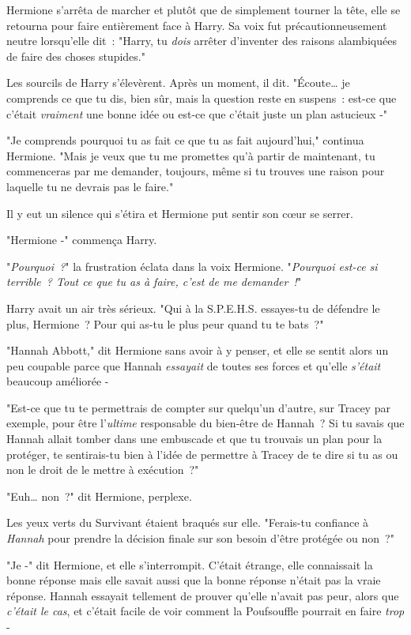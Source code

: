 Hermione s'arrêta de marcher et plutôt que de simplement tourner la tête, elle se retourna pour faire entièrement face à Harry. Sa voix fut précautionneusement neutre lorsqu'elle dit~: "Harry, tu \emph{dois} arrêter d'inventer des raisons alambiquées de faire des choses stupides."

Les sourcils de Harry s'élevèrent. Après un moment, il dit. "Écoute… je comprends ce que tu dis, bien sûr, mais la question reste en suspens~: est-ce que c'était \emph{vraiment} une bonne idée ou est-ce que c'était juste un plan astucieux -"

"Je comprends pourquoi tu as fait ce que tu as fait aujourd'hui," continua Hermione. "Mais je veux que tu me promettes qu'à partir de maintenant, tu commenceras par me demander, toujours, même si tu trouves une raison pour laquelle tu ne devrais pas le faire."

Il y eut un silence qui s'étira et Hermione put sentir son cœur se serrer.

"Hermione -" commença Harry.

"\emph{Pourquoi~?}" la frustration éclata dans la voix Hermione. "\emph{Pourquoi est-ce si terrible~? Tout ce que tu as à faire, c'est de me demander~!}"

Harry avait un air très sérieux. "Qui à la S.P.E.H.S. essayes-tu de défendre le plus, Hermione~? Pour qui as-tu le plus peur quand tu te bats~?"

"Hannah Abbott," dit Hermione sans avoir à y penser, et elle se sentit alors un peu coupable parce que Hannah \emph{essayait} de toutes ses forces et qu'elle \emph{s'était} beaucoup améliorée -

"Est-ce que tu te permettrais de compter sur quelqu'un d'autre, sur Tracey par exemple, pour être l'\emph{ultime} responsable du bien-être de Hannah~? Si tu savais que Hannah allait tomber dans une embuscade et que tu trouvais un plan pour la protéger, te sentirais-tu bien à l'idée de permettre à Tracey de te dire si tu as ou non le droit de le mettre à exécution~?"

"Euh… non~?" dit Hermione, perplexe.

Les yeux verts du Survivant étaient braqués sur elle. "Ferais-tu confiance à \emph{Hannah} pour prendre la décision finale sur son besoin d'être protégée ou non~?"

"Je -" dit Hermione, et elle s'interrompit. C'était étrange, elle connaissait la bonne réponse mais elle savait aussi que la bonne réponse n'était pas la vraie réponse. Hannah essayait tellement de prouver qu'elle n'avait pas peur, alors que \emph{c'était le cas}, et c'était facile de voir comment la Poufsouffle pourrait en faire \emph{trop} -

